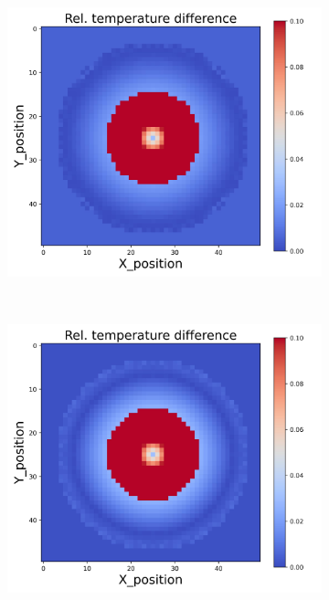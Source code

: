 {\begin{figure}[h]
\begin{minipage}{\textwidth}
\begin{subfigure}{0.27\textwidth}
        \end{subfigure}
        \begin{subfigure}{0.27\textwidth}
            \centering
            \includegraphics[width=\textwidth]{figures/raw_data/21/quad/T_bias.jpg}
        \end{subfigure}
    \end{minipage}\\
    \begin{minipage}{\textwidth}
        \centering
        \begin{subfigure}{0.27\textwidth}
            \centering
            \includegraphics[width=\textwidth]{figures/raw_data/22/quad/T_bias.jpg}

\end{subfigure}
\end{minipage}
\end{figure}}

